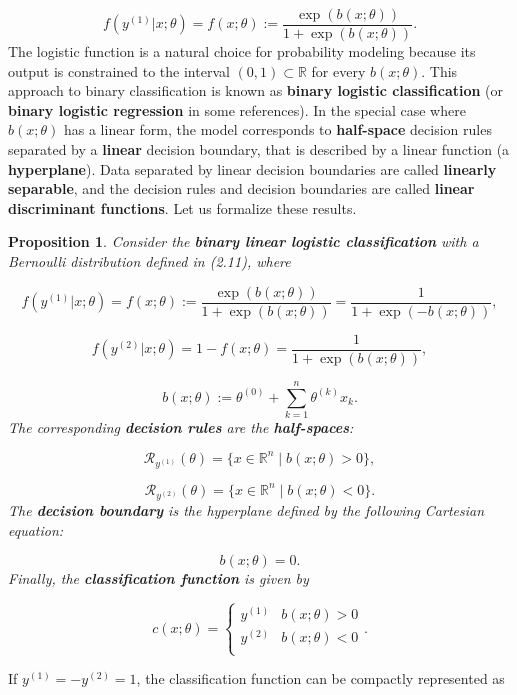 \documentclass{report}
\newtheorem{proposition}{Proposition}[chapter]
\begin{document}
\begin{equation}
f(y^{(1)}|x;\theta) = f(x;\theta) := \frac{\exp (b(x;\theta))}{1+\exp (b(x;\theta))}.
\end{equation}
The logistic function is a natural choice for probability modeling because its output is constrained to the interval $(0, 1) \subset \mathbb{R}$ for every $b(x;\theta)$. This approach to binary classification is known as \textbf{binary logistic classification} (or \textbf{binary logistic regression} in some references). In the special case where $b(x;\theta)$ has a linear form, the model corresponds to \textbf{half-space} decision rules separated by a \textbf{linear} decision boundary, that is described by a linear function (a \textbf{hyperplane}). Data separated by linear decision boundaries are called \textbf{linearly separable}, and the decision rules and decision boundaries are called \textbf{linear discriminant functions}. Let us formalize these results.

\begin{proposition}
Consider the \textbf{binary linear logistic classification} with a Bernoulli distribution defined in (2.11), where

\begin{equation}
f(y^{(1)}|x;\theta) = f(x;\theta) := \frac{\exp(b(x;\theta))}{1+\exp(b(x;\theta))} = \frac{1}{1+\exp(-b(x;\theta))},
\end{equation}

\begin{equation}
f(y^{(2)}|x;\theta) = 1- f(x;\theta) = \frac{1}{1+\exp(b(x;\theta))},
\end{equation}

\begin{equation}
b(x;\theta) := \theta^{(0)} + \sum_{k=1}^{n}\theta^{(k)}x_k.
\end{equation}
The corresponding \textbf{decision rules} are the \textbf{half-spaces}:

\begin{equation}
\mathcal{R}_{y^{(1)}}(\theta) = \{x \in \mathbb{R}^n \mid b(x;\theta) > 0 \},
\end{equation}

\begin{equation}
\mathcal{R}_{y^{(2)}}(\theta) = \{x \in \mathbb{R}^n \mid b(x;\theta) < 0 \}.
\end{equation}
The \textbf{decision boundary} is the hyperplane defined by the following Cartesian equation:

\begin{equation}
b(x;\theta) = 0.
\end{equation}
Finally, the \textbf{classification function} is given by

\begin{equation}
c(x;\theta) = \left\{\begin{matrix}
y^{(1)} & b(x;\theta) > 0\\
y^{(2)} & b(x;\theta) < 0\\
\end{matrix}\right..
\end{equation}
\end{proposition}
If $y^{(1)} = -y^{(2)} = 1$, the classification function can be compactly represented as
\end{document}
